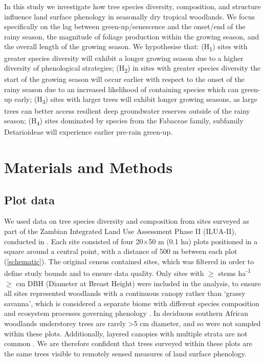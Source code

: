 \documentclass[11pt,a4paper]{article}
\begin{document}
In this study we investigate how tree species diversity, composition, and structure influence land surface phenology in seasonally dry tropical woodlands. We focus specifically on the lag between green-up/senescence and the onset/end of the rainy season, the magnitude of foliage production within the growing season, and the overall length of the growing season. We hypothesise that: (H\textsubscript{1}) sites with greater species diversity will exhibit a longer growing season due to a higher diversity of phenological strategies; (H\textsubscript{2}) in sites with greater species diversity the start of the growing season will occur earlier with respect to the onset of the rainy season due to an increased likelihood of containing species which can green-up early; (H\textsubscript{3}) sites with larger trees will exhibit longer growing seasons, as large trees can better access resilient deep groundwater reserves outside of the rainy season; (H\textsubscript{4}) sites dominated by species from the Fabaceae family, subfamily Detarioideae will experience earlier pre-rain green-up. 


\section{Materials and Methods}

\subsection{Plot data}

We used data on tree species diversity and composition from \nSites{} sites surveyed as part of the Zambian Integrated Land Use Assessment Phase II (ILUA-II), conducted in \censusDate{} \citep{Mukosha2009, Pelletier2018}. Each site consisted of four 20$\times$50 m (0.1 ha) plots positioned in a square around a central point, with a distance of 500 m between each plot (\autoref{schematic}). The original census contained \nTotalSites{} sites, which was filtered in order to define study bounds and to ensure data quality. Only sites with $\geq$\treesHa{} stems ha\textsuperscript{-1} $\geq$\stemSize{} cm DBH (Diameter at Breast Height) were included in the analysis, to ensure all sites represented woodlands with a continuous canopy rather than `grassy savanna', which is considered a separate biome with different species composition and ecosystem processes governing phenology \citep{Parr2014}. In deciduous southern African woodlands understorey trees are rarely >5 cm diameter, and so were not sampled within these plots. Additionally, layered canopies with multiple strata are not common \citep{Chidumayo2001}. We are therefore confident that trees surveyed within these plots are the same trees visible to remotely sensed measures of land surface phenology. 
\end{document}
